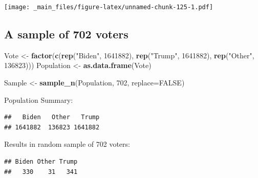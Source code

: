 \documentclass[]{book}
\newenvironment{Shaded}{\begin{snugshade}}{\end{snugshade}}
\newcommand{\KeywordTok}[1]{\textcolor[rgb]{0.13,0.29,0.53}{\textbf{#1}}}
\newcommand{\DataTypeTok}[1]{\textcolor[rgb]{0.13,0.29,0.53}{#1}}
\newcommand{\DecValTok}[1]{\textcolor[rgb]{0.00,0.00,0.81}{#1}}
\newcommand{\StringTok}[1]{\textcolor[rgb]{0.31,0.60,0.02}{#1}}
\newcommand{\OtherTok}[1]{\textcolor[rgb]{0.56,0.35,0.01}{#1}}
\newcommand{\OperatorTok}[1]{\textcolor[rgb]{0.81,0.36,0.00}{\textbf{#1}}}
\newcommand{\NormalTok}[1]{#1}
\begin{document}
\texttt{[image: \_main\_files/figure-latex/unnamed-chunk-125-1.pdf]}

\subsection{A sample of 702 voters}\label{a-sample-of-702-voters}

\begin{Shaded}
\begin{Highlighting}[]
\NormalTok{Vote <-}\StringTok{ }\KeywordTok{factor}\NormalTok{(}\KeywordTok{c}\NormalTok{(}\KeywordTok{rep}\NormalTok{(}\StringTok{"Biden"}\NormalTok{, }\DecValTok{1641882}\NormalTok{), }\KeywordTok{rep}\NormalTok{(}\StringTok{"Trump"}\NormalTok{, }\DecValTok{1641882}\NormalTok{), }\KeywordTok{rep}\NormalTok{(}\StringTok{"Other"}\NormalTok{, }\DecValTok{136823}\NormalTok{))) }
\NormalTok{Population <-}\StringTok{ }\KeywordTok{as.data.frame}\NormalTok{(Vote)}
\end{Highlighting}
\end{Shaded}

\begin{Shaded}
\begin{Highlighting}[]
\NormalTok{Sample <-}\StringTok{ }\KeywordTok{sample_n}\NormalTok{(Population, }\DecValTok{702}\NormalTok{, }\DataTypeTok{replace=}\OtherTok{FALSE}\NormalTok{)}
\end{Highlighting}
\end{Shaded}

Population Summary:

\begin{Shaded}
\end{Shaded}

\begin{verbatim}
##   Biden   Other   Trump 
## 1641882  136823 1641882
\end{verbatim}

Results in random sample of 702 voters:

\begin{Shaded}
\end{Shaded}

\begin{verbatim}
## Biden Other Trump 
##   330    31   341
\end{verbatim}
\end{document}
